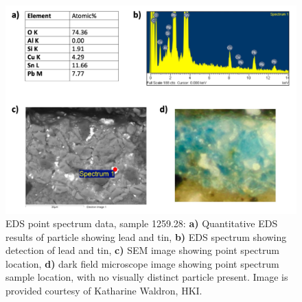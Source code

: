 \begin{figure}[H]
  \centering
  \includegraphics[width=\linewidth]{1259-28_pointspec}
\caption[EDS point spectrum data, sample 1259.28.]{EDS point spectrum data, sample 1259.28: \textbf{a)} Quantitative EDS results of particle showing lead and tin, \textbf{b)} EDS spectrum showing detection of lead and tin, \textbf{c)} SEM image showing point spectrum location, \textbf{d)} dark field microscope image showing point spectrum sample location, with no visually distinct particle present. Image is provided courtesy of Katharine Waldron, HKI.}
\label{fig:1259.28_pointspec}
\end{figure}

